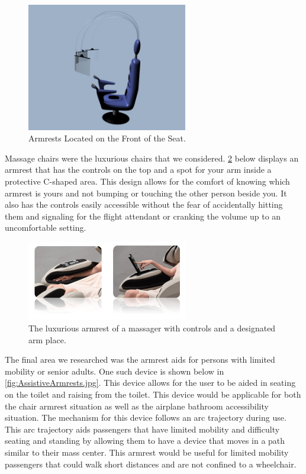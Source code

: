 \begin{figure}[h]
  \centering
     \includegraphics[width=7cm]{images/FrontArmrest.jpg}
   \caption{Armrests Located on the Front of the Seat. \cite{frontarmrests}}
  \label{fig:FrontArmrests.jpg}
\end{figure}

Massage chairs were the luxurious chairs that we considered.  \ref{fig:MassagerArmrests.jpg}  below displays an armrest that has the controls on the top and a spot for your arm inside a protective C-shaped area. This design allows for the comfort of knowing which armrest is yours and not bumping or touching the other person beside you.  It also has the controls easily accessible without the fear of accidentally hitting them and signaling for the flight attendant or cranking the volume up to an uncomfortable setting.

\begin{figure}[h]
  \centering
     \includegraphics[width=7cm]{images/MassagerArmrest.jpg}
   \caption{ The luxurious armrest of a massager with controls and a designated arm place. \cite{massage}}
  \label{fig:MassagerArmrests.jpg}
\end{figure}
 
 
The final area we researched was the armrest aids for persons with limited mobility or senior adults.  One such device is shown below in \ref{fig:AssistiveArmrests.jpg}.  This device allows for the user to be aided in seating on the toilet and raising from the toilet.  This device would be applicable for both the chair armrest situation as well as the airplane bathroom accessibility situation. The mechanism for this device follows an arc trajectory during use. This arc trajectory aids passengers that have limited mobility and difficulty seating and standing by allowing them to have a device that moves in a path similar to their mass center. This armrest would be useful for limited mobility passengers that could walk short distances and are not confined to a wheelchair.

